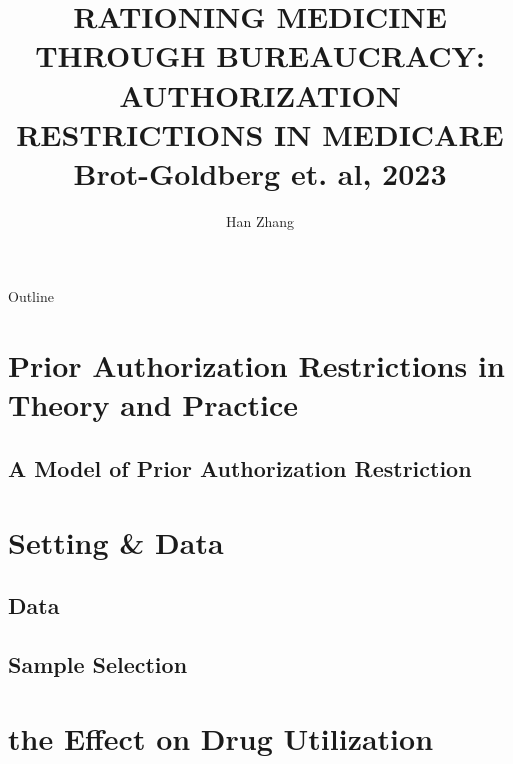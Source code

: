 \documentclass[hyperref={colorlinks,citecolor=blue,linkcolor=blue,urlcolor=blue}]{beamer}
\title[]{RATIONING MEDICINE THROUGH BUREAUCRACY: AUTHORIZATION RESTRICTIONS IN MEDICARE \\ 
Brot-Goldberg et. al, 2023}
\author{Han Zhang}
\institute{UT Austin}
\date{}
\begin{document}
\begin{frame}
  \titlepage
\end{frame}



% 

\begin{frame}{Outline}
  \tableofcontents

\end{frame}

\section{Prior Authorization Restrictions in Theory and Practice}


\subsection{A Model of Prior Authorization Restriction}




\section{Setting \& Data}

\subsection{Data}


\subsection{Sample Selection}




\section{the Effect on Drug Utilization}






\end{document}
